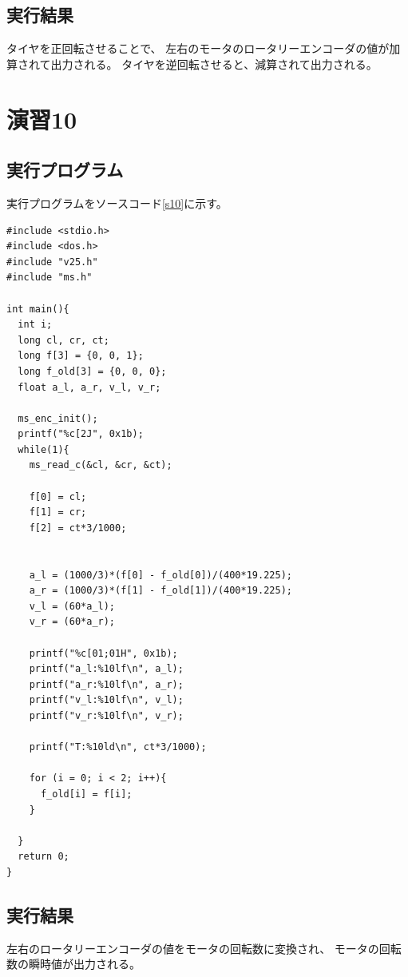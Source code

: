 \subsection{実行結果}
タイヤを正回転させることで、
左右のモータのロータリーエンコーダの値が加算されて出力される。
タイヤを逆回転させると、減算されて出力される。

\section{演習10}
\subsection{実行プログラム}
実行プログラムをソースコード\ref{s10}に示す。
\begin{lstlisting}[caption=演習10のプログラム,label=s10]
#include <stdio.h>
#include <dos.h>
#include "v25.h"
#include "ms.h"
  
int main(){
  int i;
  long cl, cr, ct;
  long f[3] = {0, 0, 1};
  long f_old[3] = {0, 0, 0};
  float a_l, a_r, v_l, v_r;
  
  ms_enc_init();
  printf("%c[2J", 0x1b);
  while(1){
    ms_read_c(&cl, &cr, &ct);
  
    f[0] = cl;
    f[1] = cr;
    f[2] = ct*3/1000;
  
  
    a_l = (1000/3)*(f[0] - f_old[0])/(400*19.225);
    a_r = (1000/3)*(f[1] - f_old[1])/(400*19.225);
    v_l = (60*a_l);
    v_r = (60*a_r);
  
    printf("%c[01;01H", 0x1b);
    printf("a_l:%10lf\n", a_l);
    printf("a_r:%10lf\n", a_r);
    printf("v_l:%10lf\n", v_l);
    printf("v_r:%10lf\n", v_r);
          
    printf("T:%10ld\n", ct*3/1000);
  
    for (i = 0; i < 2; i++){
      f_old[i] = f[i];
    }
 
  }
  return 0;
}
\end{lstlisting}

\subsection{実行結果}
左右のロータリーエンコーダの値をモータの回転数に変換され、
モータの回転数の瞬時値が出力される。

